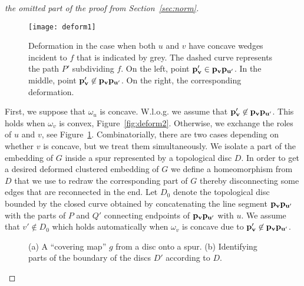 \documentclass{llncs}
\begin{document}
\begin{proof}[the omitted part of the proof from Section~\ref{sec:norm}]
 \begin{figure}[h]
  \centering
\centering
{
\texttt{[image: deform1]}
    	}

\caption{Deformation in the case when both $u$ and $v$ have concave wedges incident to $f$ that is indicated by grey.
The dashed curve represents the path $P'$ subdividing $f$.
On the left,  point ${\bf p_v'}\in{\bf p_{v}p_{u'}}$. In the middle, 
   point ${\bf p_v'}\not\in{\bf p_{v}p_{u'}}$. On the right, the corresponding
 deformation.}
\label{fig:deform1}
\end{figure}


 First, we suppose that $\omega_u$ is concave.
 W.l.o.g. we assume that ${\bf p_{v}'}\not\in{\bf p_{v}p_{u'}}$. This holds when $\omega_v$ is convex,
 Figure~\ref{fig:deform2}. Otherwise,
we exchange the roles of $u$ and $v$, see Figure~\ref{fig:deform1}. Combinatorially, there are two
cases depending on whether $v$ is concave, but we treat them
simultaneously.
We isolate a part of the embedding of $G$ inside a spur represented
by a topological disc $D$. In order to get a desired deformed clustered embedding of $G$ we define a homeomorphism from $D$ that we use to redraw the corresponding part of $G$  thereby disconnecting some edges
that are reconnected in the end.
 Let $D_0$ denote the topological disc bounded by the closed curve
obtained by concatenating the line segment ${\bf p_{v}}{\bf p_{u'}}$ with the parts
of $P$ and $Q'$ connecting endpoints of ${\bf p_{v}}{\bf p_{u'}}$  with $u$. 
We assume that $v'\not\in D_0$ which holds automatically when $\omega_v$ is concave due to ${\bf p_{v}'}\not\in{\bf p_{v}p_{u'}}$. 

 
 

 \begin{figure}[h]
  \centering
\centering
{}
    	\hspace{10px}
\caption{(a) A ``covering map'' $g$ from a disc onto a spur. (b) Identifying parts of the boundary of the discs $D'$ 
according to $D$.}

\end{figure}
 


\end{proof}
\end{document}
